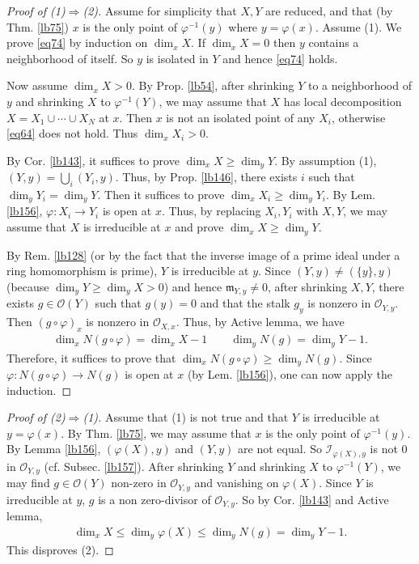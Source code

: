 \documentclass[12pt,b5paper,notitlepage]{report}
\theoremstyle{definition}
\theoremstyle{plain}
\newcommand{\scr}{\mathscr}
\newcommand{\mk}{\mathfrak m}
\numberwithin{equation}{section}
\begin{document}
\begin{proof}[Proof of (1)$\Rightarrow$(2)]
Assume for simplicity that $X,Y$ are reduced, and that (by Thm. \ref{lb75}) $x$ is the only point of $\varphi^{-1}(y)$ where $y=\varphi(x)$. Assume (1). We prove \eqref{eq74} by induction on $\dim_xX$. If $\dim_xX=0$ then $y$ contains a neighborhood of itself. So $y$ is isolated in $Y$ and hence \eqref{eq74} holds.

Now assume $\dim_xX>0$. By Prop. \ref{lb54}, after shrinking $Y$ to a neighborhood of $y$ and shrinking $X$ to $\varphi^{-1}(Y)$, we may assume that $X$ has local decomposition $X=X_1\cup\cdots\cup X_N$ at $x$. Then $x$ is not an isolated point of any $X_i$, otherwise \eqref{eq64} does not hold. Thus $\dim_x X_i>0$. 

By Cor. \ref{lb143}, it suffices to prove $\dim_xX\geq\dim_yY$. By assumption (1), $(Y,y)=\bigcup_i (Y_i,y)$. Thus, by Prop. \ref{lb146}, there exists $i$ such that $\dim_yY_i=\dim_y Y$. Then it suffices to prove $\dim_x X_i\geq\dim_y Y_i$. By Lem. \ref{lb156}, $\varphi:X_i\rightarrow Y_i$ is open at $x$. Thus, by replacing $X_i,Y_i$ with $X,Y$, we may assume that $X$ is irreducible at $x$ and prove $\dim_xX\geq\dim_yY$.

By Rem. \ref{lb128} (or by the fact that the inverse image of a prime ideal under a ring homomorphism is prime), $Y$ is irreducible at $y$. Since $(Y,y)\neq (\{y\},y)$ (because $\dim_y Y\geq\dim_y X>0$) and hence $\mk_{Y,y}\neq 0$, after shrinking $X,Y$, there exists $g\in\scr O(Y)$ such that $g(y)=0$ and that the stalk $g_y$ is nonzero in $\scr O_{Y,y}$. Then $(g\circ\varphi)_x$ is nonzero in $\scr O_{X,x}$. Thus, by Active lemma, we have
\begin{align*}
\dim_x N(g\circ\varphi)=\dim_xX-1\qquad \dim_y N(g)=\dim_yY-1.
\end{align*}
Therefore, it suffices to prove that $\dim _x N(g\circ\varphi)\geq\dim_yN(g)$. Since $\varphi:N(g\circ\varphi)\rightarrow N(g)$ is open at $x$ (by Lem. \ref{lb156}), one can now apply the induction.
\end{proof}



\begin{proof}[Proof of (2)$\Rightarrow$(1)]
Assume that (1) is not true and that $Y$ is irreducible at $y=\varphi(x)$. By Thm. \ref{lb75}, we may assume that $x$ is the only point of $\varphi^{-1}(y)$. By Lemma \ref{lb156}, $(\varphi(X),y)$ and $(Y,y)$ are not equal. So $\scr I_{\varphi(X),y}$ is not $0$ in $\scr O_{Y,y}$  (cf. Subsec. \ref{lb157}). After shrinking $Y$ and shrinking $X$ to $\varphi^{-1}(Y)$, we may find $g\in\scr O(Y)$ non-zero in $\scr O_{Y,y}$ and vanishing on $\varphi(X)$. Since $Y$ is irreducible at $y$, $g$ is a non zero-divisor of $\scr O_{Y,y}$. So by Cor. \ref{lb143} and Active lemma,
\begin{align*}
\dim_xX\leq\dim_y\varphi(X)\leq\dim_y N(g)=\dim_yY-1.
\end{align*}
This disproves (2).
\end{proof}
\end{document}
